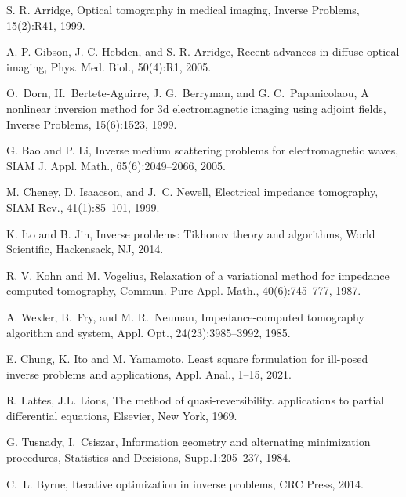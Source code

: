 \documentclass[11pt]{article}%
\renewcommand{\_}{{\fontfamily{ptm}\selectfont\textunderscore}}
\theoremstyle{plain}
\numberwithin{equation}{section}
\begin{document}
\begin{thebibliography}{lsq}



S. R. Arridge, Optical tomography in medical imaging, Inverse Problems, 15(2):R41, 1999.

A. P. Gibson, J. C. Hebden, and S. R. Arridge, Recent advances in diffuse optical imaging, Phys. Med. Biol., 50(4):R1, 2005.

O.~Dorn, H.~Bertete-Aguirre, J. G.~Berryman, and G. C.~Papanicolaou, A nonlinear inversion method for 3d electromagnetic imaging using adjoint fields, Inverse Problems, 15(6):1523, 1999.

G. Bao and P. Li, Inverse medium scattering problems for electromagnetic waves, SIAM J. Appl. Math., 65(6):2049--2066, 2005.



M. Cheney, D. Isaacson, and J.~C. Newell, Electrical impedance tomography, SIAM Rev., 41(1):85--101, 1999.



K. Ito and B. Jin, Inverse problems: Tikhonov theory and algorithms, World Scientific, Hackensack, NJ, 2014.



R. V. Kohn and M. Vogelius, Relaxation of a variational method for impedance computed tomography, Commun. Pure Appl. Math., 40(6):745--777,
  1987.

A. Wexler, B.~Fry, and M. R.~Neuman, Impedance-computed tomography algorithm and system, Appl. Opt., 24(23):3985--3992, 1985.

E. Chung, K. Ito and M. Yamamoto,  Least square formulation for ill-posed inverse problems and applications,  Appl. Anal., 1--15, 2021.
 
 
 R. Lattes, J.L. Lions, The method of quasi-reversibility. applications to
partial differential equations, Elsevier, New York, 1969.
 
 
G. Tusnady,  I.~Csiszar, Information geometry and alternating minimization procedures, Statistics and Decisions, Supp.1:205--237, 1984.


 

C.~L. Byrne, Iterative optimization in inverse problems,  CRC Press, 2014.


\end{thebibliography}
\end{document}

